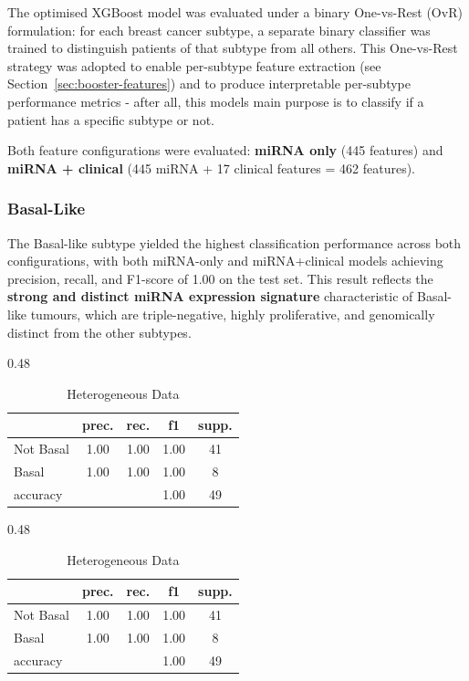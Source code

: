 The optimised XGBoost model was evaluated under a binary One-vs-Rest (OvR) formulation:
for each breast cancer subtype, a separate binary classifier was trained to distinguish
patients of that subtype from all others. This One-vs-Rest strategy was adopted to enable
per-subtype feature extraction (see Section~\ref{sec:booster-features}) and to produce
interpretable per-subtype performance metrics - after all, this models main purpose is to 
classify if a patient has a specific subtype or not.

Both feature configurations were evaluated: \textbf{miRNA only} (445 features) and
\textbf{miRNA + clinical} (445 miRNA + 17 clinical features = 462 features).

\subsubsection{Basal-Like}

The Basal-like subtype yielded the highest classification performance across both configurations,
with both miRNA-only and miRNA+clinical models achieving precision, recall, and F1-score of 1.00
on the test set. This result reflects the \textbf{strong and distinct miRNA expression signature}
characteristic of Basal-like tumours, which are triple-negative, highly proliferative, and
genomically distinct from the other subtypes.

\begin{table}[H]
    \centering
    \caption{Classification Performance for Basal-like Subtype}
    \begin{subtable}{0.48\textwidth}
        \centering
        \caption{Homogeneous Data}
        \begin{tabular}{lcccc}
            \toprule
            & prec. & rec. & f1 & supp. \\
            \midrule
            Not Basal & 1.00 & 1.00 & 1.00 & 41 \\
            Basal     & 1.00 & 1.00 & 1.00 & 8 \\
            \midrule
            accuracy  &      &      & 1.00 & 49 \\
            \bottomrule
        \end{tabular}
    \end{subtable}
    \hfill
    \begin{subtable}{0.48\textwidth}
        \centering
        \caption{Heterogeneous Data}
        \begin{tabular}{lcccc}
            \toprule
            & prec. & rec. & f1 & supp. \\
            \midrule
            Not Basal & 1.00 & 1.00 & 1.00 & 41 \\
            Basal     & 1.00 & 1.00 & 1.00 & 8 \\
            \midrule
            accuracy  &      &      & 1.00 & 49 \\
            \bottomrule
        \end{tabular}
    \end{subtable}
\end{table}

